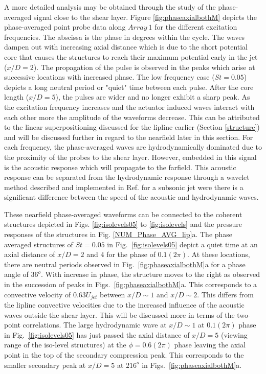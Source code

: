 \documentclass[english]{aiaa-tc}
\begin{document}
A more detailed analysis may be obtained through the study of the phase-averaged signal close to the shear layer.
Figure \ref{fig:phaseaxialbothM} depicts the phase-averaged point probe data along $Array~1$ for the different excitation frequencies. The abscissa is the phase in degrees within the cycle. The waves dampen out with increasing axial distance which is due to the short potential core that causes the structures to reach their maximum potential early in the jet ($x/D=2$). %
The propagation of the pulse is observed in the peaks which arise at
successive locations with increased phase. The low frequency case
($St=0.05$) depicts a long neutral period or "quiet" time between each
pulse. After the core length ($x/D=5$), the pulses are wider and no
longer exhibit a sharp peak.
As the excitation frequency increases and the actuator induced waves interact with each other more the amplitude of the waveforms decrease. This can be attributed to the linear superpositioning discussed for the lipline earlier (Section \ref{structure}) and will be discussed further in regard to the nearfield later in this section.
For each frequency, the phase-averaged waves are hydrodynamically dominated due to the proximity of the probes to the shear layer. However, embedded in this signal is the acoustic response which will propagate to the farfield. This acoustic response can be separated from the hydrodynamic response through a wavelet method described and implemented in Ref. \cite{Crawley2015} for a subsonic jet were there is a significant difference between the speed of the acoustic and hydrodynamic waves.

These nearfield phase-averaged waveforms can be connected to the coherent structures depicted in Figs. \ref{fig:isolevels05} to \ref{fig:isolevels} and the pressure responses of the structures in Fig. \ref{NUM_Phase_AVG_lip}a.
The phase averaged structures of $St=0.05$ in
Fig.~\ref{fig:isolevels05} depict a quiet time at an axial distance of $x/D=2$
and $4$ for the phase of $0.1(2\pi)$. At these
locations, there are neutral periods observed in Fig.~\ref{fig:phaseaxialbothM}a for
a phase angle of $36^o$.  With increase in phase, the structure moves
to the right as observed in the succession of peaks in
Figs.~\ref{fig:phaseaxialbothM}a.  This corresponds to a convective
velocity of $0.63U_{jet}$ between $x/D\sim 1$ and $x/D\sim 2$. This differs from the lipline convective velocities due to the increased influence of the acoustic waves outside the shear layer. This will be discussed more in terms of the two-point correlations.
The large hydrodynamic wave at $x/D\sim 1$ at
$0.1(2\pi)$ phase in Fig.~\ref{fig:isolevels05} has just passed the axial
distance of $x/D=5$ (viewing range of the iso-level structures) at the
$\phi=0.6(2\pi)$ phase leaving the axial point in the top of the secondary compression peak. This corresponds to the smaller secondary peak at
$x/D=5$ at $216^o$ in Figs.~\ref{fig:phaseaxialbothM}a.
\end{document}
